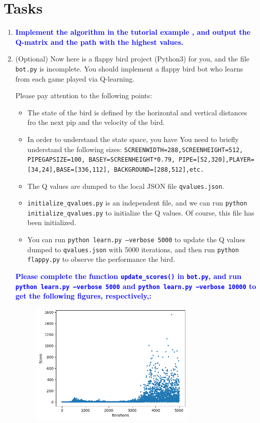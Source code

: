 \documentclass[a4paper, 11pt]{article}
\begin{document}
\section{Tasks}
\begin{enumerate}
	\item \textcolor{blue}{\textbf{Implement the algorithm in the tutorial example , and output the Q-matrix and the path with the highest values.}}
	\item (Optional) Now here is a flappy bird project (Python3) for you, and the file \texttt{bot.py} is incomplete. You should implement a flappy bird bot who learns from each game played via Q-learning. 

	Please pay attention to the following points:
	\begin{itemize}
		\item The state of the bird is defined by the horizontal and vertical distances fro the next pip and the velocity of the bird.
		\item In order to understand the state space, you have You need to briefly understand the following sizes: \texttt{SCREENWIDTH=288,SCREENHEIGHT=512, PIPEGAPSIZE=100, BASEY=SCREENHEIGHT*0.79, PIPE=[52,320],PLAYER=[34,24],BASE=[336,112], BACKGROUND=[288,512],etc.}
		\item The Q values are dumped to the local JSON file \texttt{qvalues.json}.
		\item \texttt{initialize\_qvalues.py} is an independent file, and we can run \texttt{python initialize\_qvalues.py} to initialize the Q values. Of course, this file has been initialized.
		\item You can run \texttt{python learn.py --verbose 5000} to update the Q values dumped to \texttt{qvalues.json} with 5000 iterations, and then run \texttt{python flappy.py} to observe the performance the bird.
	\end{itemize}
	\textcolor{blue}{\textbf{Please complete the function \texttt{update\_scores()} in \texttt{bot.py}, and run \texttt{python learn.py --verbose 5000} and \texttt{python learn.py --verbose 10000} to get the following figures, respectively,:}}
	\begin{figure}[ht]
	\centering
	\includegraphics[width=8cm]{Pic/score5000}

\end{figure}
\end{enumerate}
\end{document}
